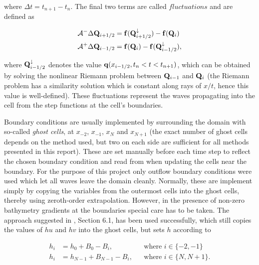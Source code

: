 where $\Delta t = t_{n+1} - t_n$. The final two terms are called $fluctuations$ and are defined as

\begin{subequations}
\label{eq:fluctuations}
\begin{align}
  \mathcal{A}^- \Delta \vb Q_{i+1/2} &= \vb f(\vb Q_{i+1/2}^\downarrow) - \vb f(\vb Q_{i}) \\
  \mathcal{A}^+ \Delta \vb Q_{i-1/2} &= \vb f(\vb Q_{i}) - \vb f(\vb Q_{i-1/2}^\downarrow),
\end{align}
\end{subequations}

where $\vb Q_{i-1/2}^\downarrow$ denotes the value $\vb q(x_{i-1/2}, t_n < t < t_{n+1})$, which can be obtained by solving the nonlinear Riemann problem between $\vb Q_{i-1}$ and $\vb Q_i$ (the Riemann problem has a similarity solution which is constant along rays of $x/t$, hence this value is well-defined). These fluctuations represent the waves propagating into the cell from the step functions at the cell's boundaries.

Boundary conditions are usually implemented by surrounding the domain with so-called \emph{ghost cells}, at $x_{-2}$, $x_{-1}$, $x_N$ and $x_{N+1}$ (the exact number of ghost cells depends on the method used, but two on each side are sufficient for all methods presented in this report). These are set manually before each time step to reflect the chosen boundary condition and read from when updating the cells near the boundary. For the purpose of this project only outflow boundary conditions were used which let all waves leave the domain cleanly. Normally, these are implement simply by copying the variables from the outermost cells into the ghost cells, thereby using zeroth-order extrapolation. However, in the presence of non-zero bathymetry gradients at the boundaries special care has to be taken. The approach suggested in \cite{leveque1998balancing}, Section 6.1, has been used successfully, which still copies the values of $hu$ and $hv$ into the ghost cells, but sets $h$ according to

\begin{subequations}
  \label{eq:bcs}
  \begin{align}
    h_i &= h_0 + B_0 - B_i, &&\mbox{where $i \in \{-2, -1\}$} \\
    h_i &= h_{N-1} + B_{N-1} - B_i, &&\mbox{where $i \in \{N, N+1\}$}.
  \end{align}
\end{subequations}


